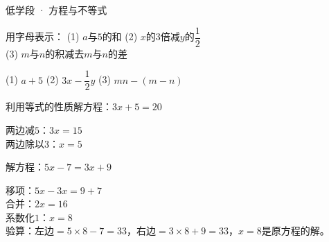 \documentclass[a4paper,12pt]{ctexart}
\begin{document}
\pagestyle{empty}

\begin{center}
  \large 低学段 · 方程与不等式
\end{center}
\vspace{0.3cm}




\begin{example}
用字母表示：
(1) $a$与$5$的和 \qquad (2) $x$的$3$倍减$y$的$\dfrac{1}{2}$\\
(3) $m$与$n$的积减去$m$与$n$的差
\end{example}
\begin{solution}
(1) $a+5$ \qquad (2) $3x-\dfrac{1}{2}y$ \qquad (3) $mn-(m-n)$
\end{solution}



\begin{example}
利用等式的性质解方程：$3x+5=20$
\end{example}
\begin{solution}
两边减$5$：$3x=15$\\
两边除以$3$：$x=5$
\end{solution}



\begin{example}
解方程：$5x-7=3x+9$
\end{example}
\begin{solution}
移项：$5x-3x=9+7$\\
合并：$2x=16$\\
系数化$1$：$x=8$\\
验算：左边$=5\times8-7=33$，右边$=3\times8+9=33$，$x=8$是原方程的解。
\end{solution}
\end{document}
